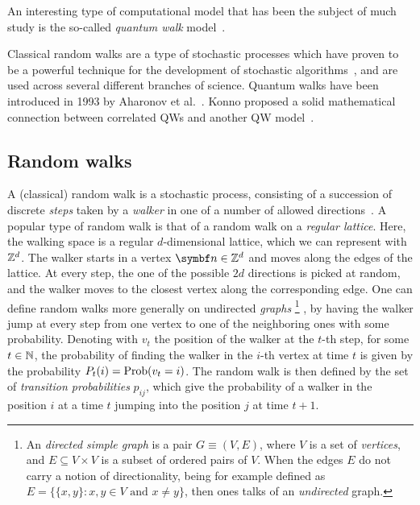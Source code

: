 An interesting type of computational model that has been the subject of much study is the so-called \textit{quantum walk} model~\cite{aharonov2000quantum,kempe2003quantum,venegasandraca2012quantum,portugal2013quantum}.

Classical random walks are a type of stochastic processes which have proven to be a powerful technique for the development of stochastic algorithms~\cite{motwani1995randomized,schoning1999probabilistic}, and are used across several different branches of science.
Quantum walks have been introduced in 1993 by Aharonov et al.~\cite{aharonov1993quantum}.
Konno proposed a solid mathematical connection between correlated \acp{QW} and another QW model~\cite{konno2003limit}.

\subsection{Random walks}
A (classical) random walk is a stochastic process, consisting of a succession of discrete \textit{steps} taken by a \textit{walker} in one of a number of allowed directions~\cite{lovasz1993random}.
A popular type of random walk is that of a random walk on a \textit{regular lattice}. Here, the walking space is a regular $d$-dimensional lattice, which we can represent with $\mathbb{Z}^d$. The walker starts in a vertex $\bs n\in\ZZ^d$ and moves along the edges of the lattice.
At every step, the one of the possible $2d$ directions is picked at random, and the walker moves to the closest vertex along the corresponding edge.
One can define random walks more generally on undirected \textit{graphs}
\footnote{An \textit{directed simple graph} is a pair $G\equiv (V,E)$, where $V$ is a set of \textit{vertices}, and $E\subseteq V\times V$ is a subset of ordered pairs of $V$. When the edges $E$ do not carry a notion of directionality, being for example defined as $E=\{\{x,y\} : x,y\in V\text{ and }x\neq y\}$, then ones talks of an \textit{undirected} graph.}
, by having the walker jump at every step from one vertex to one of the neighboring ones with some probability.
Denoting with $v_t$ the position of the walker at the $t$-th step, for some $t\in\mathbb{N}$, the probability of finding the walker in the $i$-th vertex at time $t$ is given by the probability
$P_t(i)=\operatorname*{Prob}(v_t=i)$. The random walk is then defined by the set of \textit{transition probabilities} $p_{ij}$, which give the probability of a walker in the position $i$ at a time $t$ jumping into the position $j$ at time $t+1$.

